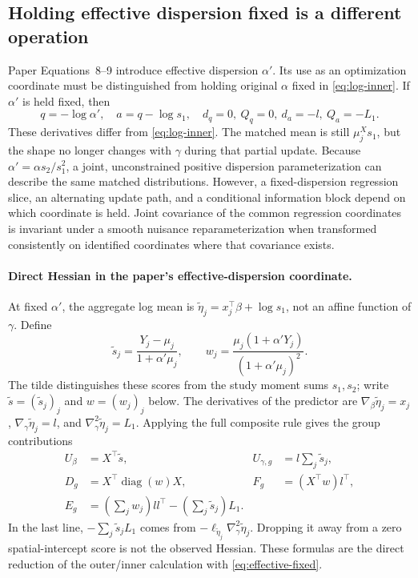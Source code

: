\documentclass[11pt,a4paper]{article}
\newcommand{\diag}{\operatorname{diag}}
\numberwithin{equation}{section}
\begin{document}
\subsection{Holding effective dispersion fixed is a different operation}
Paper Equations~8--9 introduce effective dispersion $\alpha'$.
Its use as an optimization coordinate must be distinguished from
holding original $\alpha$ fixed in \eqref{eq:log-inner}.
If $\alpha'$ is held fixed, then
\begin{equation}
 q=-\log\alpha',\quad a=q-\log s_1,\quad
 d_q=0,\ Q_q=0,\ d_a=-l,\ Q_a=-L_1 .
 \label{eq:effective-fixed}
\end{equation}
These derivatives differ from \eqref{eq:log-inner}.
The matched mean is still $\mu_j^Xs_1$, but the shape no longer changes with
$\gamma$ during that partial update.
Because $\alpha'=\alpha s_2/s_1^2$, a joint, unconstrained positive
dispersion parameterization can describe the same matched distributions.
However, a fixed-dispersion regression slice, an alternating update path,
and a conditional information block depend on which coordinate is held.
Joint covariance of the common regression coordinates is invariant under
a smooth nuisance reparameterization when transformed consistently
on identified coordinates where that covariance exists.

\paragraph{Direct Hessian in the paper's effective-dispersion coordinate.}
At fixed $\alpha'$, the aggregate log mean is
$\widetilde\eta_j=x_j^\top\beta+\log s_1$, not an affine function
of $\gamma$. Define
\[
 \widetilde s_j=\frac{Y_j-\mu_j}{1+\alpha'\mu_j},\qquad
 w_j=\frac{\mu_j(1+\alpha'Y_j)}{(1+\alpha'\mu_j)^2}.
\]
The tilde distinguishes these scores from the study moment sums $s_1,s_2$;
write $\widetilde s=(\widetilde s_j)_j$ and $w=(w_j)_j$ below.
The derivatives of the predictor are
$\nabla_\beta\widetilde\eta_j=x_j$,
$\nabla_\gamma\widetilde\eta_j=l$, and
$\nabla_\gamma^2\widetilde\eta_j=L_1$.
Applying the full composite rule gives the group contributions
\begin{align}
 U_\beta&=X^\top\widetilde s,& U_{\gamma,g}&=l\sum_j\widetilde s_j,\\
 D_g&=X^\top\diag(w)X,& F_g&=(X^\top w)l^\top,\\
 E_g&=\left(\sum_jw_j\right)ll^\top-\left(\sum_j\widetilde s_j\right)L_1.
 \label{eq:effective-direct}
\end{align}
In the last line, $-\sum_j\widetilde s_jL_1$ comes from
$-\ell_{\widetilde\eta_j}\nabla_\gamma^2\widetilde\eta_j$.
Dropping it away from a zero spatial-intercept score is not the
observed Hessian. These formulas are the direct reduction of the
outer/inner calculation with \eqref{eq:effective-fixed}.
\end{document}
